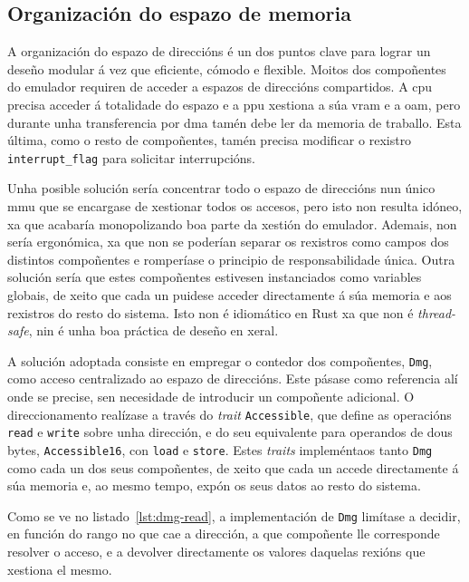 


\subsection{Organización do espazo de memoria}
A organización do espazo de direccións é un dos puntos clave para lograr un deseño modular á vez que eficiente, cómodo e flexible.
Moitos dos compoñentes do emulador requiren de acceder a espazos de direccións compartidos. A \acrshort{cpu} precisa acceder á totalidade do espazo
e a \acrshort{ppu} xestiona a súa \acrshort{vram} e a \acrshort{oam}, pero durante unha transferencia por \acrshort{dma} tamén debe ler da memoria de traballo.
Esta última, como o resto de compoñentes, tamén precisa modificar o rexistro \texttt{interrupt\_flag} para solicitar interrupcións.


Unha posible solución sería concentrar todo o espazo de direccións nun único \acrfull{mmu} que se encargase de xestionar todos os accesos,
pero isto non resulta idóneo, xa que acabaría monopolizando boa parte da xestión do emulador.
Ademais, non sería ergonómica, xa que non se poderían separar os rexistros como campos dos distintos compoñentes e romperíase o principio de responsabilidade única.
Outra solución sería que estes compoñentes estivesen instanciados como variables globais, de xeito que cada un puidese acceder directamente á súa memoria e aos rexistros do resto do sistema.
Isto non é idiomático en Rust xa que non é \textit{thread-safe}, nin é unha boa práctica de deseño en xeral.


A solución adoptada consiste en empregar o contedor dos compoñentes, \texttt{Dmg}, como acceso centralizado ao espazo de direccións.
Este pásase como referencia alí onde se precise, sen necesidade de introducir un compoñente adicional.
O direccionamento realízase a través do \textit{trait} \texttt{Accessible}, que define as operacións \texttt{read} e \texttt{write} sobre unha dirección,
e do seu equivalente para operandos de dous bytes, \texttt{Accessible16}, con \texttt{load} e \texttt{store}.
Estes \textit{traits} impleméntaos tanto \texttt{Dmg} como cada un dos seus compoñentes,
de xeito que cada un accede directamente á súa memoria e, ao mesmo tempo, expón os seus datos ao resto do sistema.

Como se ve no listado~\ref{lst:dmg-read}, a implementación de \texttt{Dmg} limítase a decidir, en función do rango no que cae a dirección,
a que compoñente lle corresponde resolver o acceso, e a devolver directamente os valores daquelas rexións que xestiona el mesmo.

